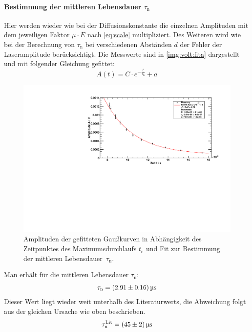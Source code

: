 \paragraph{Bestimmung der mittleren Lebensdauer $\tau_\text{n}$}
Hier werden wieder wie bei der Diffusionskonstante die einzelnen Amplituden mit dem jeweiligen Faktor $\mu \cdot E$ nach \autoref{eq:scale} 
multipliziert. Des Weiteren wird wie bei der Berechnung von $\tau_\text{n}$ bei verschiedenen Abständen $d$ der Fehler der Laseramplitude 
berücksichtigt. Die Messwerte sind in \autoref{img:volt:fita} dargestellt und mit folgender Gleichung gefittet:
\begin{equation}
  A(t) = C \cdot e^{- \frac{t}{\tau_\text{n}}} + a
\end{equation}
\begin{figure}[H]
\begin{center}
  \includegraphics[width=\textwidth]{../img/part2/volt_fitA.pdf}
  \caption{Amplituden der gefitteten Gaußkurven in Abhängigkeit des Zeitpunktes des Maximumsdurchlaufs $t_{\text{c}}$
  und Fit zur Bestimmung der mittleren Lebensdauer~$\tau_{\text{n}}$.}
  \label{img:volt:fita}
\end{center}
\end{figure}
Man erhält für die mittleren Lebensdauer $\tau_\text{n}$:
\begin{equation}
  \tau_\text{n} = (2.91 \pm 0.16)\,\text{\textmu s}
\end{equation}
Dieser Wert liegt wieder weit unterhalb des Literaturwerts, die Abweichung folgt aus der gleichen Ursache wie oben beschrieben.
\begin{equation}
  \tau_\text{n}^\text{Lit} = (45 \pm 2)\,\text{\textmu s}
\end{equation}